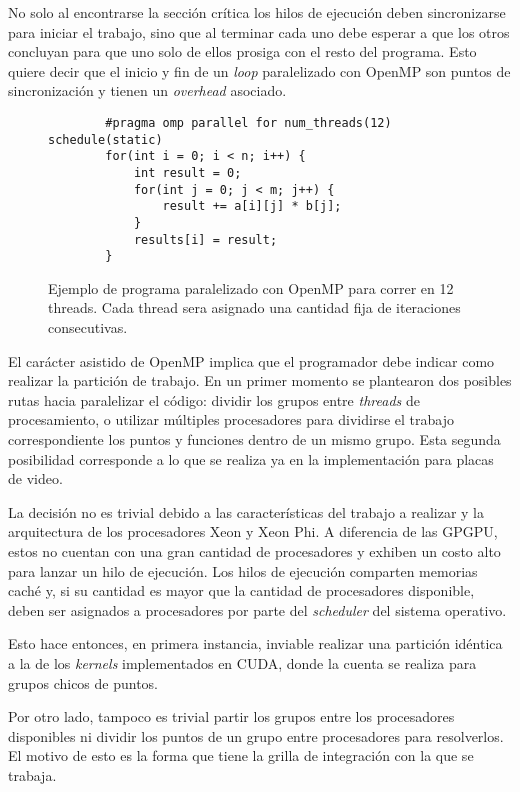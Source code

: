 No solo al encontrarse la secci\'on cr\'itica los hilos de ejecuci\'on deben
sincronizarse para iniciar el trabajo, sino que al terminar cada uno debe esperar
a que los otros concluyan para que uno solo de ellos prosiga con el resto del
programa. Esto quiere decir que el inicio y fin de un \textit{loop} paralelizado
con OpenMP son puntos de sincronizaci\'on y tienen un \textit{overhead} asociado.

\begin{figure}[htbp]
    \label{fig:openmp-example}
    \begin{lstlisting}
        #pragma omp parallel for num_threads(12) schedule(static)
        for(int i = 0; i < n; i++) {
            int result = 0;
            for(int j = 0; j < m; j++) {
                result += a[i][j] * b[j];
            }
            results[i] = result;
        }
    \end{lstlisting}
    \caption{Ejemplo de programa paralelizado con OpenMP para correr en 12 threads. Cada thread
    sera asignado una cantidad fija de iteraciones consecutivas.}
\end{figure}

El car\'acter asistido de OpenMP implica que el programador debe indicar como
realizar la partici\'on de trabajo. En un primer momento se plantearon dos posibles rutas
hacia paralelizar el c\'odigo: dividir los grupos entre \textit{threads} de
procesamiento, o utilizar m\'ultiples procesadores para dividirse el trabajo
correspondiente los puntos y funciones dentro de un mismo grupo. Esta segunda
posibilidad corresponde a lo que se realiza ya en la implementaci\'on para placas
de video.

La decisi\'on no es trivial debido a las caracter\'isticas del trabajo a realizar
y la arquitectura de los procesadores Xeon y Xeon Phi. A diferencia de las GPGPU,
estos no cuentan con una gran cantidad de procesadores y exhiben un costo alto
para lanzar un hilo de ejecuci\'on. Los hilos de ejecuci\'on comparten memorias
cach\'e y, si su cantidad es mayor que la cantidad de procesadores disponible,
deben ser asignados a procesadores por parte del \textit{scheduler} del sistema
operativo.

Esto hace entonces, en primera instancia, inviable realizar una partici\'on id\'entica a
la de los \textit{kernels} implementados en CUDA, donde la cuenta se realiza para
grupos chicos de puntos.

Por otro lado, tampoco es trivial partir los grupos entre los procesadores disponibles
ni dividir los puntos de un grupo entre procesadores para resolverlos.
El motivo de esto es la forma que tiene la grilla de integraci\'on con la que se trabaja.

